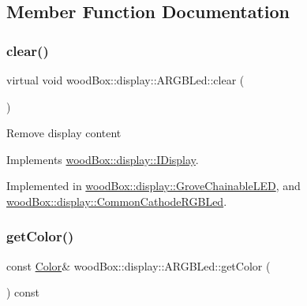 \subsection{Member Function Documentation}
\mbox{\label{classwood_box_1_1display_1_1_a_r_g_b_led_a01eeaee1bbb439e81f5f9bc536c04df7}} 
\subsubsection{\texorpdfstring{clear()}{clear()}}
{\footnotesize\ttfamily virtual void wood\+Box\+::display\+::\+A\+R\+G\+B\+Led\+::clear (\begin{DoxyParamCaption}{ }\end{DoxyParamCaption})\hspace{0.3cm}{\ttfamily [pure virtual]}}

Remove display content 

Implements \mbox{\hyperlink{classwood_box_1_1display_1_1_i_display_a7030f0768c1ef15ce936a259406168dc}{wood\+Box\+::display\+::\+I\+Display}}.



Implemented in \mbox{\hyperlink{classwood_box_1_1display_1_1_grove_chainable_l_e_d_a1c42c42ee9643aa914ab20a191e4adfd}{wood\+Box\+::display\+::\+Grove\+Chainable\+L\+ED}}, and \mbox{\hyperlink{classwood_box_1_1display_1_1_common_cathode_r_g_b_led_a4ae3f4b7e03751dd6352adfa1b90fca0}{wood\+Box\+::display\+::\+Common\+Cathode\+R\+G\+B\+Led}}.

\mbox{\label{classwood_box_1_1display_1_1_a_r_g_b_led_ae0bd01eab303006612eb46058824b0c1}} 
\subsubsection{\texorpdfstring{get\+Color()}{getColor()}}
{\footnotesize\ttfamily const \mbox{\hyperlink{structwood_box_1_1display_1_1_a_r_g_b_led_1_1_color}{Color}}\& wood\+Box\+::display\+::\+A\+R\+G\+B\+Led\+::get\+Color (\begin{DoxyParamCaption}{ }\end{DoxyParamCaption}) const\hspace{0.3cm}{\ttfamily [inline]}}

